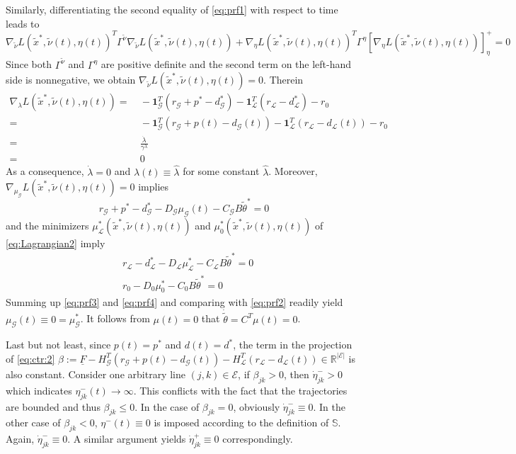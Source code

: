 \documentclass[journal,12pt,onecolumn,draftclsnofoot]{IEEEtran}
\newcommand{\beq}{\begin{equation}}
\newcommand{\eeq}{\end{equation}}
\begin{document}
	Similarly, differentiating the second equality of \eqref{eq:prf1} with respect to time leads to 
	\beq
	\nabla_{\tilde{\nu}} L(\tilde x^*,\tilde{\nu}(t),\eta(t))^T   \Gamma^{\tilde{\nu}} \nabla_{\tilde{\nu}} L(\tilde x^*,\tilde{\nu}(t),\eta(t))  +  
	\nabla_{\eta} L(\tilde x^*,\tilde{\nu}(t),\eta(t))^T   \Gamma^{\eta} \left[\nabla_{\eta} L(\tilde x^*,\tilde{\nu}(t),\eta(t)) \right] ^+_\eta =0
	\eeq
	Since both $ \Gamma^{\tilde{\nu}} $ and $ \Gamma^{\eta}$ are positive definite and the second term on the left-hand side is nonnegative, we obtain $\nabla_{\tilde{\nu}} L(\tilde x^*,\tilde{\nu}(t),\eta(t)) =0$. Therein
	\beq\label{eq:prf2}
	\begin{split}
		\nabla_{\lambda} L(\tilde x^*,\tilde{\nu}(t),\eta(t)) =& \ - \mathbf 1^T_\mathcal{G} (r_\mathcal{G}+p^*-d^*_\mathcal{G})  - \mathbf 1^T_\mathcal{L} (r_\mathcal{L}-d^*_\mathcal{L}) -r_0 \\
		= & \ - \mathbf 1^T_\mathcal{G} (r_\mathcal{G}+p(t)-d_\mathcal{G}(t))  - \mathbf 1^T_\mathcal{L} (r_\mathcal{L}-d_\mathcal{L}(t)) -r_0 \\
		= &\ \frac{\dot \lambda}{\gamma^\lambda} \\
		=& \ 0
	\end{split}
	\eeq
	As a consequence, $\dot \lambda = 0 $ and $\lambda(t) \equiv \hat{\lambda}$ for some constant $\hat{\lambda}$. Moreover, $\nabla_{\mu_\mathcal{G}} L(\tilde x^*,\tilde{\nu}(t),\eta(t)) =0$ implies 
	\beq\label{eq:prf3}
	r_\mathcal{G} +p^*  - d_\mathcal{G}^*  -D_\mathcal{G}  \mu_\mathcal{G} (t) - C_{\mathcal{G}}B  \tilde{\theta}^*= 0
	\eeq
	and the minimizers $\mu_\mathcal{L}^*(\tilde x^*,\tilde{\nu}(t),\eta(t))  $ and $\mu_0^*(\tilde x^*,\tilde{\nu}(t),\eta(t))$ of \eqref{eq:Lagrangian2} imply 
	\beq\label{eq:prf4}
	\begin{split}
		&	r_{\mathcal{L}} - d_{\mathcal{L}}^*  -D_{\mathcal{L}} \mu_{\mathcal{L}}^* - C_{\mathcal{L}}B  \tilde{\theta}^*= 0 \\
		&	r_0 -D_0 \mu_0^* - C_0 B  \tilde{\theta}^* =0
	\end{split}
	\eeq
	Summing up \eqref{eq:prf3} and \eqref{eq:prf4} and comparing with \eqref{eq:prf2} readily yield $\mu_{\mathcal{G}}(t) \equiv 0 = \mu_{\mathcal{G}}^*$. It follows from $\mu(t)=0$ that $\dot {\tilde{\theta}}= C^T \mu(t)=0$. 
	
	Last but not least, since $p(t)=p^*$ and $d(t)=d^*$, the term in the projection of \eqref{eq:ctr:2} $\beta:=\underline{F} - H^T_{\mathcal{G}}(r_\mathcal{G}+p(t)-d_\mathcal{G}(t)) - H^T_\mathcal{L}(r_\mathcal{L}-d_\mathcal{L}(t)) \in\mathbb{R}^{|\mathcal{E}|}$ is also constant. Consider one arbitrary line $(j,k)\in\mathcal{E}$, if $\beta_{jk}>0$, then $\dot \eta^-_{jk}>0$ which indicates $\eta^-_{jk}(t)\rightarrow \infty$. This conflicts with the fact that the trajectories are bounded and thus $\beta_{jk} \le 0$. In the case of $\beta_{jk} = 0$, obviously $\dot \eta^-_{jk}\equiv 0$. In the other case of $\beta_{jk}<0$, $\eta^-(t) \equiv 0$ is imposed according to the definition of $\mathbb{S}$. Again, $\dot \eta^-_{jk}\equiv 0$. A similar argument yields $\dot \eta^+_{jk}\equiv 0$ correspondingly.
	
\end{document}
